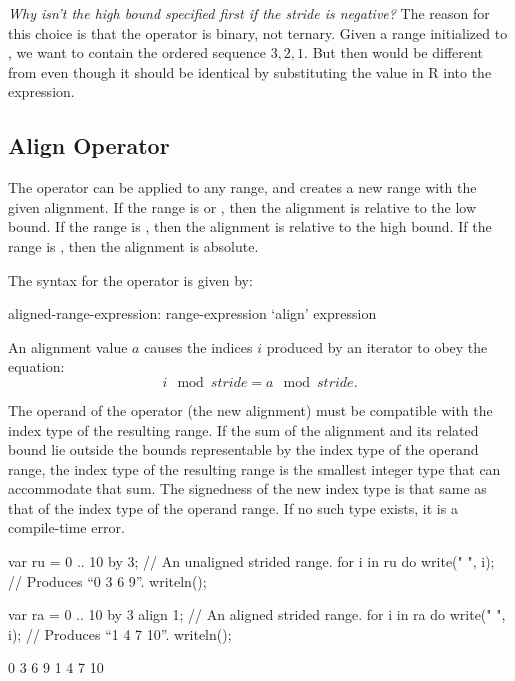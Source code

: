 \begin{rationale}
{\it Why isn't the high bound specified first if the stride is
negative?}  The reason for this choice is that the  operator
is binary, not ternary.  Given a range  initialized
to , we want  to contain the ordered sequence
$3,2,1$.  But then  would be different from  even though it should be identical by substituting the value in
R into the expression.
\end{rationale}


\subsection{Align Operator}
\label{Align_Operator}

The  operator can be applied to any range, and creates a new range
with the given alignment.  If the range is  or ,
then the alignment is relative to the low bound.  If the range
is , then the alignment is relative to the high bound.  If the
range is , then the alignment is absolute.

The syntax for
the  operator is given by:
\begin{syntax}
aligned-range-expression:
  range-expression `align' expression
\end{syntax}
\noindent An alignment value $a$ causes the indices $i$ produced by an iterator
to obey the equation:
\begin{equation}
i \mod stride = a \mod stride.
\end{equation}

The operand of the  operator (the new alignment) must be compatible
with the index type of the resulting range.  If the sum of the alignment and its
related bound lie outside the bounds representable by the index type of the
operand range, the index type of the resulting range is the smallest integer
type that can accommodate that sum.  The signedness of the new index type is
that same as that of the index type of the operand range.  If no such type
exists, it is a compile-time error.

\begin{example}
\begin{chapelpre}
\end{chapelpre}
\begin{chapel}
var ru = 0 .. 10 by 3;			// An unaligned strided range.
for i in ru do
  write(" ", i);			// Produces ``0 3 6 9''.
writeln();

var ra = 0 .. 10 by 3 align 1;		// An aligned strided range.
for i in ra do
  write(" ", i);			// Produces ``1 4 7 10''.
writeln();
\end{chapel}
\begin{chapeloutput}
 0 3 6 9
 1 4 7 10
\end{chapeloutput}
\end{example}

